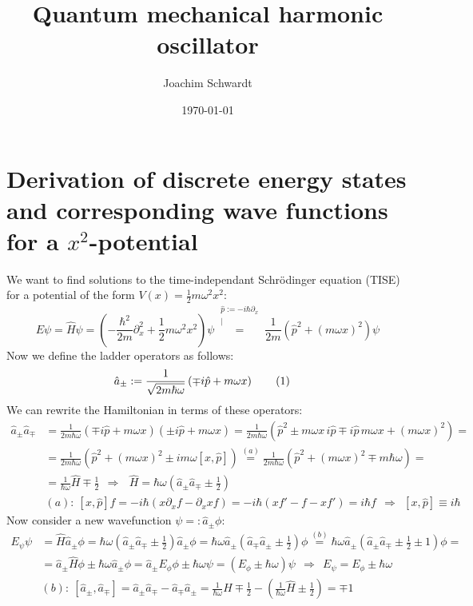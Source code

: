 \documentclass[a4paper,12pt]{article}
\newcommand\numberthis{\addtocounter{equation}{1}\tag{\theequation}}
\begin{document}
\title{Quantum mechanical harmonic oscillator}
\author{Joachim Schwardt}
\date{\today}
\maketitle

\section{Derivation of discrete energy states and corresponding wave functions for a $x^2$-potential}
We want to find solutions to the time-independant Schrödinger equation (TISE) for a potential of the form $V(x)=\frac{1}{2}m\omega^2 x^2$:
$$E\psi=\hat{H}\psi=\left(-\frac{\hbar^2}{2m}\partial_x^2+\frac{1}{2}m\omega^2 x^2\right)\psi\overset{\substack{\hat{p}:=-i\hbar\partial_x \\|}}{=}\frac{1}{2m}\left(\hat{p}^2+(m\omega x)^2\right)\psi$$
Now we define the ladder operators as follows:
\begin{align*}
\hat{a}_\pm&:=\frac{1}{\sqrt{2m\hbar\omega}}\left(\mp i\hat{p}+m\omega x\right) \label{a pm}\numberthis
\end{align*}
We can rewrite the Hamiltonian in terms of these operators:
\begin{align*}
\hat{a}_\pm\hat{a}_\mp&=\frac{1}{2m\hbar\omega}(\mp i\hat{p}+m\omega x)(\pm i\hat{p}+m\omega x)=\frac{1}{2m\hbar\omega}\left(\hat{p}^2\pm m\omega x\,i\hat{p}\mp i\hat{p}\,m\omega x+(m\omega x)^2\right)=\\
&=\frac{1}{2m\hbar\omega}\left(\hat{p}^2+(m\omega x)^2\pm im\omega [x,\hat{p}]\right)\overset{(a)}{=}\frac{1}{2m\hbar\omega}\left(\hat{p}^2+(m\omega x)^2\mp m\hbar\omega\right)=\\
&=\frac{1}{\hbar\omega}\hat{H}\mp\frac{1}{2}\ \ \Rightarrow\ \ \ \hat{H}=\hbar\omega (\hat{a}_\pm\hat{a}_\mp\pm\frac{1}{2})\\
&(a):\ [x,\hat{p}]f=-i\hbar (x\partial_xf-\partial_xxf)=-i\hbar(xf'-f-xf')=i\hbar f\ \ \Rightarrow\ \ [x,\hat{p}]\equiv i\hbar
\end{align*}
Now consider a new wavefunction $\psi=:\hat{a}_\pm\phi$:
\begin{align*}
E_\psi\psi&=\hat{H}\hat{a}_\pm\phi=\hbar\omega (\hat{a}_\pm\hat{a}_\mp\pm\frac{1}{2})\hat{a}_\pm\phi=\hbar\omega \hat{a}_\pm(\hat{a}_\mp \hat{a}_\pm\pm\frac{1}{2})\phi\overset{(b)}{=}\hbar\omega\hat{a}_\pm(\hat{a}_\pm\hat{a}_\mp\pm\frac{1}{2}\pm 1)\phi=\\
&=\hat{a}_\pm\hat{H}\phi\pm\hbar\omega\hat{a}_\pm\phi=\hat{a}_\pm E_\phi\phi\pm\hbar\omega\psi=(E_\phi\pm\hbar\omega)\psi\ \ \Rightarrow\ \ E_\psi=E_\phi\pm\hbar\omega\\
&(b):\ [\hat{a}_\pm,\hat{a}_\mp]=\hat{a}_\pm\hat{a}_\mp-\hat{a}_\mp\hat{a}_\pm=\frac{1}{\hbar\omega}\hat{H}\mp\frac{1}{2}-(\frac{1}{\hbar\omega}\hat{H}\pm\frac{1}{2})=\mp 1
\end{align*}
\end{document}
